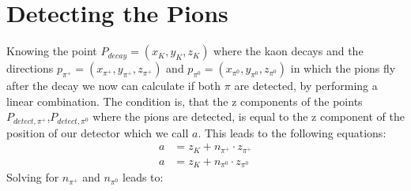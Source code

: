 \documentclass[10pt,a4paper]{report}
\begin{document}
\section{Detecting the Pions}

Knowing the point $P_{decay}=(x_K,y_K,z_K)$  where the kaon decays and the directions $p_{\pi^+}=(x_{\pi^+},y_{\pi^+},z_{\pi^+})$ and $p_{\pi^0}=(x_{\pi^0},y_{\pi^0},z_{\pi^0})$ in which the pions fly after the decay we now can calculate if both $\pi$ are detected, by performing a linear combination. The condition is, that the z components of the points $P_{detect,\pi^+}$,$P_{detect,\pi^0}$ where the pions are detected, is equal to the z component of the position of our detector which we call $a$. This leads to the following equations:
\begin{align*}
a &= z_K + n_{\pi^+} \cdot z_{\pi^+} \\ 
a &= z_K + n_{\pi^0} \cdot z_{\pi^0}
\end{align*} 
Solving for $n_{\pi^+}$ and  $n_{\pi^0}$ leads to: 
\end{document}
